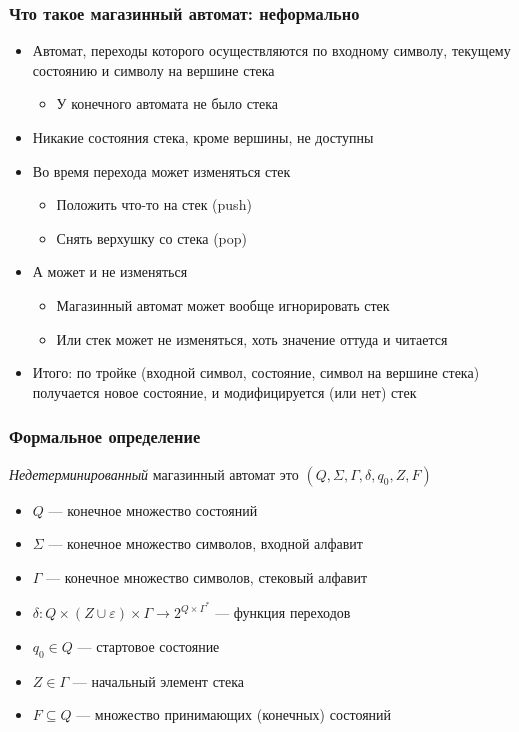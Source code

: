 \documentclass[dvipsnames]{beamer}
\begin{document}
\begin{frame}[fragile]
  \transwipe[direction=90]
  \frametitle{Что такое магазинный автомат: неформально}
\begin{itemize}
	\item Автомат, переходы которого осуществляются по входному символу, текущему состоянию и символу на вершине стека
	\begin{itemize}
		\item У конечного автомата не было стека
	\end{itemize}
	\item Никакие состояния стека, кроме вершины, не доступны
	\item Во время перехода может изменяться стек
	\begin{itemize}
		\item Положить что-то на стек (push)
		\item Снять верхушку со стека (pop)
	\end{itemize}
	\item А может и не изменяться
	\begin{itemize}
		\item Магазинный автомат может вообще игнорировать стек
		\item Или стек может не изменяться, хоть значение оттуда и читается
	\end{itemize}
	\item Итого: по тройке (входной символ, состояние, символ на вершине стека) получается новое состояние, и модифицируется (или нет) стек
\end{itemize}
\end{frame}

\begin{frame}[fragile]
  \transwipe[direction=90]
  \frametitle{Формальное определение}
  \emph{Недетерминированный} магазинный автомат это $(Q, \Sigma, \Gamma, \delta, q_0, Z, F)$
  \begin{itemize}
    \item $Q$ --- конечное множество состояний
    \item $\Sigma$ --- конечное множество символов, входной алфавит
    \item $\Gamma$ --- конечное множество символов, стековый алфавит
    \item $\delta: Q \times (Z \cup \varepsilon) \times \Gamma \to 2^{Q \times \Gamma^*}$ --- функция переходов
    \item $q_0 \in Q$ --- стартовое состояние
    \item $Z \in \Gamma$ --- начальный элемент стека
    \item $F \subseteq Q$ --- множество принимающих (конечных) состояний
  \end{itemize}
\end{frame}
\end{document}
